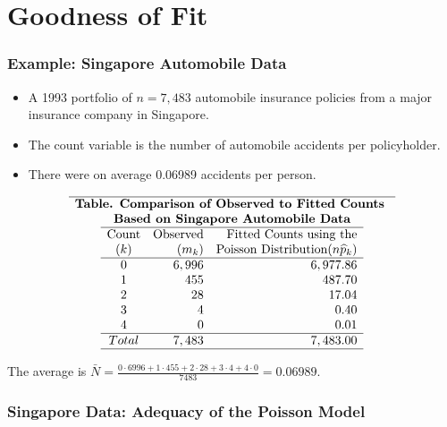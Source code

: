 \documentclass[]{book}
\begin{document}
\section{Goodness of Fit}\label{goodness-of-fit}

\subsubsection{Example: Singapore Automobile
Data}\label{example-singapore-automobile-data}

\begin{itemize}
\item
  A 1993 portfolio of \(n=7,483\) automobile insurance policies from a
  major insurance company in Singapore.
\item
  The count variable is the number of automobile accidents per
  policyholder.
\item
  There were on average 0.06989 accidents per person.
\end{itemize}

\[
\begin{matrix}
\hline \textbf{Table. Comparison of Observed to Fitted Counts } \\
\textbf{Based on Singapore Automobile Data} \\
\begin{array}{crr}
\hline
\text{Count} & \text{Observed} & \text{Fitted Counts using the} \\
(k) & (m_k) & \text{Poisson Distribution} (n\widehat{p}_k) \\
\hline
0 & 6,996 & 6,977.86 \\
1 & 455 & 487.70 \\
2 & 28 & 17.04 \\
3 & 4 & 0.40 \\
4 & 0 & 0.01 \\ \hline Total & 7,483 & 7,483.00 \\ \hline
\end{array}
\end{matrix}\]

The average is
\(\bar{N} = \frac{0\cdot 6996 + 1 \cdot 455 + 2 \cdot 28 + 3 \cdot 4 + 4 \cdot 0}{7483} = 0.06989\).

\subsubsection{Singapore Data: Adequacy of the Poisson
Model}\label{singapore-data-adequacy-of-the-poisson-model}
\end{document}

